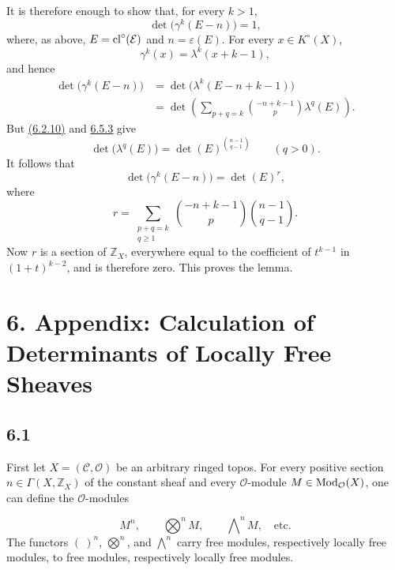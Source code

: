 It is therefore enough to show that, for every $k>1$,
\[
\det\bigl(\gamma^k(E-n)\bigr)=1,
\]
where, as above, $E=\operatorname{cl}^\circ(\mathcal E)$ and
$n=\varepsilon(E)$. For every $x\in K^\circ(X)$,
\[
\gamma^k(x)=\lambda^k(x+k-1),
\]
and hence
\[
\begin{aligned}
\det\bigl(\gamma^k(E-n)\bigr)
&=\det\bigl(\lambda^k(E-n+k-1)\bigr)\\
&=\det\left(
\sum_{p+q=k}\binom{-n+k-1}{p}\lambda^q(E)
\right).
\end{aligned}
\]
But \hyperlink{sga6.e10.eq.6-2-10}{(6.2.10)} and \hyperlink{sga6.e10.para.6-5-3}{6.5.3} give
\[
\det\bigl(\lambda^q(E)\bigr)
=\det(E)^{\binom{n-1}{q-1}}
\qquad(q>0).
\]
It follows that
\[
\det\bigl(\gamma^k(E-n)\bigr)=\det(E)^r,
\]
where
\[
r=\sum_{\substack{p+q=k\\q\geq1}}
\binom{-n+k-1}{p}\binom{n-1}{q-1}.
\]
Now $r$ is a section of $\mathbb Z_X$, everywhere equal to the coefficient of
$t^{k-1}$ in $(1+t)^{k-2}$, and is therefore zero. This proves the lemma.

\section*{6. Appendix: Calculation of Determinants of Locally Free Sheaves}

\subsection*{6.1}
First let $X=(\mathcal C,\mathcal O)$ be an arbitrary ringed topos. For every
positive section $n\in\Gamma(X,\mathbb Z_X)$ of the constant sheaf and every
$\mathcal O$-module $M\in\operatorname{Mod}_{\mathcal O}(X)$, one can define the
$\mathcal O$-modules

\begin{equation}\tag{6.1.1}
M^n,\qquad \bigotimes\nolimits^n M,\qquad
\bigwedge\nolimits^n M,\quad\text{etc.}
\end{equation}
The functors $(\ )^n$, $\bigotimes^n$, and $\bigwedge^n$ carry free modules,
respectively locally free modules, to free modules, respectively locally free
modules.

